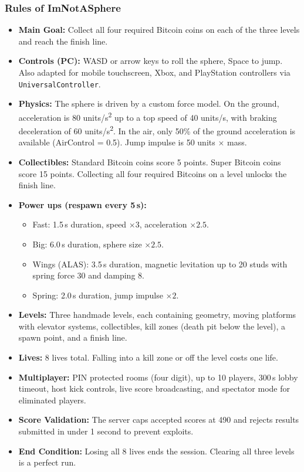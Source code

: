 \documentclass[12pt,letterpaper]{article}
\begin{document}
\subsubsection{Rules of ImNotASphere}
\begin{itemize}
  \item \textbf{Main Goal:} Collect all four required Bitcoin coins on each of the three levels and reach the finish line.
  \item \textbf{Controls (PC):} WASD or arrow keys to roll the sphere, Space to jump. Also adapted for mobile touchscreen, Xbox, and PlayStation controllers via \texttt{UniversalController}.
  \item \textbf{Physics:} The sphere is driven by a custom force model. On the ground, acceleration is 80 units/s\textsuperscript{2} up to a top speed of 40 units/s, with braking deceleration of 60 units/s\textsuperscript{2}. In the air, only 50\% of the ground acceleration is available (AirControl = 0.5). Jump impulse is 50 units $\times$ mass.
  \item \textbf{Collectibles:} Standard Bitcoin coins score 5 points. Super Bitcoin coins score 15 points. Collecting all four required Bitcoins on a level unlocks the finish line.
  \item \textbf{Power ups (respawn every 5\,s):}
  \begin{itemize}
    \item Fast: 1.5\,s duration, speed $\times 3$, acceleration $\times 2.5$.
    \item Big: 6.0\,s duration, sphere size $\times 2.5$.
    \item Wings (ALAS): 3.5\,s duration, magnetic levitation up to 20 studs with spring force 30 and damping 8.
    \item Spring: 2.0\,s duration, jump impulse $\times 2$.
  \end{itemize}
  \item \textbf{Levels:} Three handmade levels, each containing geometry, moving platforms with elevator systems, collectibles, kill zones (death pit below the level), a spawn point, and a finish line.
  \item \textbf{Lives:} 8 lives total. Falling into a kill zone or off the level costs one life.
  \item \textbf{Multiplayer:} PIN protected rooms (four digit), up to 10 players, 300\,s lobby timeout, host kick controls, live score broadcasting, and spectator mode for eliminated players.
  \item \textbf{Score Validation:} The server caps accepted scores at 490 and rejects results submitted in under 1 second to prevent exploits.
  \item \textbf{End Condition:} Losing all 8 lives ends the session. Clearing all three levels is a perfect run.
\end{itemize}
\end{document}
